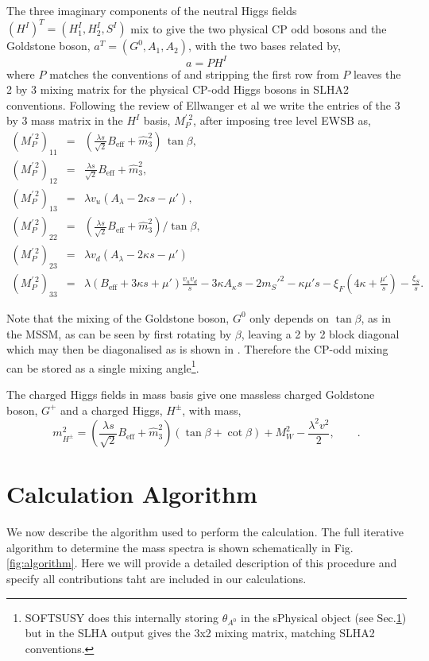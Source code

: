 \documentclass[final,3p,times,pdflatex]{elsarticle}
\newcommand{\be}{\begin{equation}}
\newcommand{\ee}{\end{equation}}
\newcommand{\ba}{\begin{eqnarray}}
\newcommand{\ea}{\end{eqnarray}}
\newcommand{\ds}{\displaystyle}
\begin{document}
The three imaginary components of the neutral Higgs fields $(H^I)^T = (H^I_1, H_2^I, S^I)$ mix to give the two physical CP odd bosons and the Goldstone boson, $a^T = (G^0, A_1, A_2)$, with the two bases related by,
 \be a = P H^I \ee where $P$ matches the conventions of \cite{Degrassi:2009yq} and stripping the first row from $P$ leaves the 2 by 3 mixing matrix for the physical CP-odd Higgs bosons in SLHA2 conventions\cite{Allanach:2008qq}. Following the review of Ellwanger et al \cite{Ellwanger:2009dp} we write the entries of the 3 by 3 mass matrix in the $H^I$ basis, $ M^{\prime \, 2}_{P}$, after imposing tree level EWSB as,
\ba
( M^{\prime \, 2}_{P})_{11} & = & (\ds\frac{\lambda s}{\sqrt{2}} B_\textrm{eff} +
\widehat{m}_3^2)\,\tan\beta , \\
( M^{\prime \, 2}_{P})_{12} & = & \ds\frac{\lambda s}{\sqrt{2}} B_\textrm{eff} +
\widehat{m}_3^2, \\
( M^{\prime \, 2}_{P})_{13} & = & \lambda v_u (A_\lambda - 2\kappa s - \mu'), \\
( M^{\prime \, 2}_{P})_{22} & = & (\ds\frac{\lambda s}{\sqrt{2}} B_\textrm{eff} +
\widehat{m}_3^2)/\tan\beta ,  \\
( M^{\prime \, 2}_{P})_{23} & = & \lambda v_d (A_\lambda - 2\kappa s - \mu')\\
( M^{\prime \, 2}_{P})_{33} & = & \lambda (B_\textrm{eff}+3\kappa s +\mu')\ds\frac{v_u
v_d}{s} -3\kappa A_\kappa s  -2 m_{S}'^2 -\kappa \mu' s 
-\xi_F\left(4\kappa + \frac{\mu'}{s}\right) -\ds\frac{\xi_S}{s}.
\label{eq:MA0}
\ea

Note that the mixing of the Goldstone boson, $G^0$ only depends on $\tan\beta$, as in the MSSM, as can be seen by first rotating by $\beta$, leaving a 2 by 2 block diagonal which may then be diagonalised as is shown in \cite{Ellwanger:2009dp}.  Therefore the CP-odd mixing can be stored as a single mixing angle\footnote{SOFTSUSY does this internally storing $\theta_{A^0}$ in the sPhysical object (see Sec.\ref{}) but in the SLHA output gives the 3x2 mixing matrix, matching SLHA2 conventions.}.


The charged Higgs fields in mass basis give one massless charged Goldstone boson, $G^+$ and a charged Higgs, $H^\pm$, with mass,
\be m_{H^\pm}^2 = \left(\ds\frac{\lambda s}{\sqrt{2}} B_\textrm{eff} +
\widehat{m}_3^2\right)(\tan \beta + \cot \beta) + M_W^2 - \ds\frac{\lambda^2 v^2}{2},\qquad. \ee
  
\section{Calculation Algorithm \label{sec:calculation}}
We now describe the algorithm used to perform the calculation.  The full iterative algorithm to determine the mass spectra is shown schematically in Fig.\ref{fig:algorithm}.  Here we will provide a detailed description of this procedure and specify all contributions taht are included in our calculations.  
\end{document}
